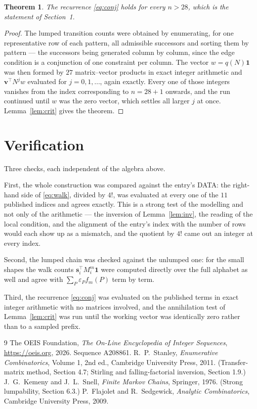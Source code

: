 \documentclass[11pt,a4paper]{article}
\theoremstyle{plain}
\newtheorem{theorem}{Theorem}
\theoremstyle{definition}
\begin{document}
\begin{theorem}
The recurrence \eqref{eq:conj} holds for every $n>28$, which is the statement of
Section~1.
\end{theorem}

\begin{proof}
The lumped transition counts were obtained by enumerating, for one representative row of
each pattern, all admissible successors and sorting them by pattern --- the successors being
generated column by column, since the edge condition is a conjunction of one constraint per
column. The vector $w=q(N)\mathbf{1}$ was then formed by $27$ matrix--vector products
in exact integer arithmetic and $\mathbf{v}^{\!\top}N^{j}w$ evaluated for
$j=0,1,\dots$, again exactly. Every one of those integers vanishes from the index
corresponding to $n=28+1$ onwards, and the run continued until $w$ was the zero vector,
which settles all larger $j$ at once. Lemma~\ref{lem:crit} gives the theorem.
\end{proof}

\section{Verification}

Three checks, each independent of the algebra above.

First, the whole construction was compared against the entry's DATA: the right-hand side of
\eqref{eq:walk}, divided by $4!$, was evaluated at every one of the $11$
published indices and agrees exactly. This is a strong test of the modelling and not only of
the arithmetic --- the inversion of Lemma~\ref{lem:inv}, the reading of the local
condition, and the alignment of the entry's index with the number of rows would each
show up as a mismatch, and the quotient by $4!$ came out an integer at every index.

Second, the lumped chain was checked against the unlumped one: for the small shapes the walk
counts $\mathbf{s}_i^{\!\top}M_i^{m}\mathbf{1}$ were computed directly over the full
alphabet as well and agree with $\sum_P\varepsilon_Pf_m(P)$ term by term.

Third, the recurrence \eqref{eq:conj} was evaluated on the published terms in exact integer
arithmetic with no matrices involved, and the annihilation test of Lemma~\ref{lem:crit} was
run until the working vector was identically zero rather than to a sampled prefix.

\begin{thebibliography}{9}
 The OEIS Foundation, \emph{The On-Line Encyclopedia of Integer
Sequences}, \url{https://oeis.org}, 2026. Sequence A208861.
 R.~P.~Stanley, \emph{Enumerative Combinatorics}, Volume 1, 2nd ed.,
Cambridge University Press, 2011. (Transfer-matrix method, Section 4.7; Stirling and
falling-factorial inversion, Section 1.9.)
 J.~G.~Kemeny and J.~L.~Snell, \emph{Finite Markov Chains}, Springer,
1976. (Strong lumpability, Section 6.3.)
 P.~Flajolet and R.~Sedgewick, \emph{Analytic Combinatorics}, Cambridge
University Press, 2009.
\end{thebibliography}
\end{document}
